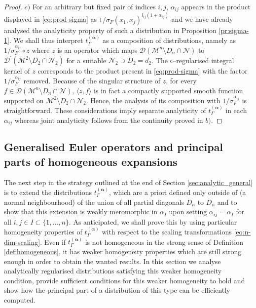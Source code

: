 \documentclass[a4paper,10pt,twoside]{article}
\numberwithin{equation}{section}
\newcounter{and}
\def\M{\mathcal{M}}
\def\N{\mathcal{N}}
\def\D{\mathcal{D}}
\def\balpha{{\boldsymbol{\alpha}}}
\theoremstyle{plain}
\theoremstyle{definition}
\begin{document}
\begin{proof}
$c)$ 
For an arbitrary but fixed pair of indices $i,j$, $\alpha_{ij}$ appears in the product displayed in \eqref{eq:prod-sigma} as $1/\sigma_F(x_1,x_j)^{l_{ij}(1+\alpha_{ij})}$ and we have already analysed the analyticity property of such a distribution in Proposition \ref{pr:sigma-1}. 
We shall thus interpret $t_\Gamma^{(\balpha)}$ as a composition of distributions, namely as $1/\sigma_F^{\alpha_{ij}}\circ z $
 where $z$ is an operator which maps $\D(\M^{n}\setminus D_{n}\cap \N)$ to $ \D^\prime(\M^{2}\setminus D_2\cap \N_2)$ for a suitable $\N_2\supset D_2=d_2$. The $\epsilon$--regularised integral kernel of $z$ corresponds to the product present in \eqref{eq:prod-sigma} with the factor  $1/\sigma_F^{\alpha_{ij}}$ removed. Because of the singular structure of $z$, for every $f\in \D(\M^{n}\setminus D_{n}\cap \N)$, $\langle z,f\rangle$ is in fact a compactly supported smooth function supported on $\M^{2}\setminus D_2\cap \N_2$. Hence, the analysis of its composition with $1/\sigma_F^{\alpha_{ij}}$ is straightforward. These considerations imply separate analyticity of $t_\Gamma^{(\balpha)}$ in each $\alpha_{ij}$ whereas joint analyticity follows from the continuity proved in $b)$.
\end{proof}




\subsection{Generalised Euler operators and principal parts of homogeneous expansions}

\label{sec_R}

The next step in the strategy outlined at the end of Section \ref{sec:analytic_general} is to extend the distributions $t^{(\balpha)}_\Gamma$, which are a priori defined only outside of (a normal neighbourhood) of the union of all partial diagonals $D_n$ to $D_n$ and to show that this extension is weakly meromorphic in $\alpha_I$ upon setting $\alpha_{ij}=\alpha_I$ for all $i,j\in I\subset \{1,\ldots,n\}$. As anticipated, we shall prove this by using particular homogeneity properties of $t^{(\balpha)}_\Gamma$ with respect to the scaling transformations \eqref{eq:n-dim-scaling}. Even if $t^{(\balpha)}_\Gamma$ is not homogeneous in the strong sense of Definition \ref{def:homogeneous}, it has weaker homogeneity properties which are still strong enough in order to obtain the wanted results. In this section we analyse analytically regularised distributions satisfying this weaker homogeneity condition, provide sufficient conditions for this weaker homogeneity to hold and show how the principal part of a distribution of this type can be efficiently computed.
\end{document}
